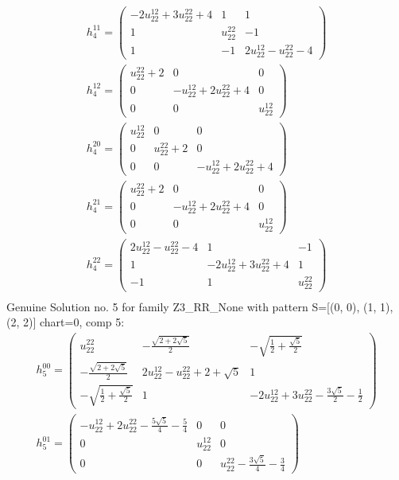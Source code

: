 \documentclass[a4paper, 11pt, twoside, onecolumn]{article}
\begin{document}
\begin{landscape}
\begin{gather*}
	 h_4^{11}=\begin{pmatrix}- 2 u^{12}_{22} + 3 u^{22}_{22} + 4 & 1 & 1\\1 & u^{22}_{22} & -1\\1 & -1 & 2 u^{12}_{22} - u^{22}_{22} - 4\end{pmatrix}\\ 
	 h_4^{12}=\begin{pmatrix}u^{22}_{22} + 2 & 0 & 0\\0 & - u^{12}_{22} + 2 u^{22}_{22} + 4 & 0\\0 & 0 & u^{12}_{22}\end{pmatrix}\\ 
	 h_4^{20}=\begin{pmatrix}u^{12}_{22} & 0 & 0\\0 & u^{22}_{22} + 2 & 0\\0 & 0 & - u^{12}_{22} + 2 u^{22}_{22} + 4\end{pmatrix}\\ 
	 h_4^{21}=\begin{pmatrix}u^{22}_{22} + 2 & 0 & 0\\0 & - u^{12}_{22} + 2 u^{22}_{22} + 4 & 0\\0 & 0 & u^{12}_{22}\end{pmatrix}\\ 
	 h_4^{22}=\begin{pmatrix}2 u^{12}_{22} - u^{22}_{22} - 4 & 1 & -1\\1 & - 2 u^{12}_{22} + 3 u^{22}_{22} + 4 & 1\\-1 & 1 & u^{22}_{22}\end{pmatrix}\\ 
\end{gather*} 
Genuine Solution no. 5 for family Z3_RR_None with pattern S=[(0, 0), (1, 1), (2, 2)] chart=0, comp 5: 
\begin{gather*} 
	 h_5^{00}=\begin{pmatrix}u^{22}_{22} & - \frac{\sqrt{2 + 2 \sqrt{5}}}{2} & - \sqrt{\frac{1}{2} + \frac{\sqrt{5}}{2}}\\- \frac{\sqrt{2 + 2 \sqrt{5}}}{2} & 2 u^{12}_{22} - u^{22}_{22} + 2 + \sqrt{5} & 1\\- \sqrt{\frac{1}{2} + \frac{\sqrt{5}}{2}} & 1 & - 2 u^{12}_{22} + 3 u^{22}_{22} - \frac{3 \sqrt{5}}{2} - \frac{1}{2}\end{pmatrix}\\ 
	 h_5^{01}=\begin{pmatrix}- u^{12}_{22} + 2 u^{22}_{22} - \frac{5 \sqrt{5}}{4} - \frac{5}{4} & 0 & 0\\0 & u^{12}_{22} & 0\\0 & 0 & u^{22}_{22} - \frac{3 \sqrt{5}}{4} - \frac{3}{4}\end{pmatrix}\\ 

\end{gather*}
\end{landscape}
\end{document}
